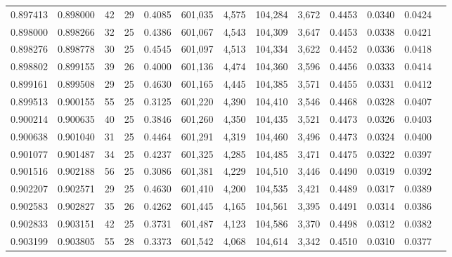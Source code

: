\begin{tabular}{rrrrrrrrrrrrr}
0.897413 & 0.898000 &    42 &  29 &                                     0.4085 & 601,035 &   4,575 & 104,284 &   3,672 & 0.4453 & 0.0340 & 0.0424 \\
0.898000 & 0.898266 &    32 &  25 &                                     0.4386 & 601,067 &   4,543 & 104,309 &   3,647 & 0.4453 & 0.0338 & 0.0421 \\
0.898276 & 0.898778 &    30 &  25 &                                     0.4545 & 601,097 &   4,513 & 104,334 &   3,622 & 0.4452 & 0.0336 & 0.0418 \\
0.898802 & 0.899155 &    39 &  26 &                                     0.4000 & 601,136 &   4,474 & 104,360 &   3,596 & 0.4456 & 0.0333 & 0.0414 \\
0.899161 & 0.899508 &    29 &  25 &                                     0.4630 & 601,165 &   4,445 & 104,385 &   3,571 & 0.4455 & 0.0331 & 0.0412 \\
0.899513 & 0.900155 &    55 &  25 &                                     0.3125 & 601,220 &   4,390 & 104,410 &   3,546 & 0.4468 & 0.0328 & 0.0407 \\
0.900214 & 0.900635 &    40 &  25 &                                     0.3846 & 601,260 &   4,350 & 104,435 &   3,521 & 0.4473 & 0.0326 & 0.0403 \\
0.900638 & 0.901040 &    31 &  25 &                                     0.4464 & 601,291 &   4,319 & 104,460 &   3,496 & 0.4473 & 0.0324 & 0.0400 \\
0.901077 & 0.901487 &    34 &  25 &                                     0.4237 & 601,325 &   4,285 & 104,485 &   3,471 & 0.4475 & 0.0322 & 0.0397 \\
0.901516 & 0.902188 &    56 &  25 &                                     0.3086 & 601,381 &   4,229 & 104,510 &   3,446 & 0.4490 & 0.0319 & 0.0392 \\
0.902207 & 0.902571 &    29 &  25 &                                     0.4630 & 601,410 &   4,200 & 104,535 &   3,421 & 0.4489 & 0.0317 & 0.0389 \\
0.902583 & 0.902827 &    35 &  26 &                                     0.4262 & 601,445 &   4,165 & 104,561 &   3,395 & 0.4491 & 0.0314 & 0.0386 \\
0.902833 & 0.903151 &    42 &  25 &                                     0.3731 & 601,487 &   4,123 & 104,586 &   3,370 & 0.4498 & 0.0312 & 0.0382 \\
0.903199 & 0.903805 &    55 &  28 &                                     0.3373 & 601,542 &   4,068 & 104,614 &   3,342 & 0.4510 & 0.0310 & 0.0377 \\

\end{tabular}

